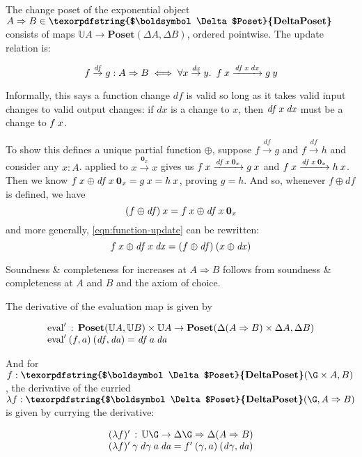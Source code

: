 \documentclass{rntz}\usepackage[a5]{rntzgeometry}\usepackage[fullwidth=130mm,width=330pt,]{narrow}
\newcommand\mathvar[1]{\ensuremath{#1}} %
\renewcommand\mathvar[1]{\ensuremath{\mathit{#1}}} %
\newcommand\cat\textbf
\newcommand\CP{\cat{\texorpdfstring{$\boldsymbol\Delta$Poset}{DeltaPoset}}}
\newcommand\Poset{\cat{Poset}}
\newcommand\expO[2]{#1 \Rightarrow #2}
\newcommand\D\Delta
\newcommand\x\times
\newcommand\fn\lambda
\newcommand\zero{\ensuremath{\mathbold{0}}}
\newcommand\<{\mskip 4mu plus 4mu minus 1mu}
\newcommand\da{\mathvar{da}}
\newcommand\dx{\mathvar{dx}}
\newcommand\df{\mathvar{df}}
\newcommand\fname\text
\newcommand\valfn{\ensuremath{\mathbb{U}}}
\newcommand\vals{\valfn}
\newcommand\chgs[1]{\D{#1}}
\newcommand\deriv[1]{\ensuremath{#1'}}
\newcommand\upd{\mathbin{\oplus}}
\newcommand\updfn{\ensuremath{{\upd}}}
\newcommand\quantifierspace{~\,}
\newcommand\fa[1]{\forall #1.\quantifierspace}
\newcommand\validarrow\to
\newcommand\valid[1]{\mathrel{\overset{#1}{\validarrow}}}
\newcommand\longvalid[1]{\mathrel{\xrightarrow{#1}}}
\newcommand\vld[3]{{#2 \valid{#1} #3}}
\newcommand\longvld[3]{{#2 \longvalid{#1} #3}}
\begin{document}
The change poset of the exponential object $\expO A B \in \CP$ consists of maps
$\vals A \to \Poset(\chgs A, \chgs B)$, ordered pointwise. The update relation
is:

\begin{equation}\label{eqn:function-update}
  f \valid\df g : \expO A B
  \iff \fa{x \valid\dx y} f\<x \longvalid{\df\<x\<\dx} g\<y
\end{equation}

\noindent Informally, this says a function change $\df$ is valid so long as it
takes valid input changes to valid output changes: if $\dx$ is a change to $x$,
then $\df\<x\<\dx$ must be a change to $f\<x$.

To show this defines a unique partial function \updfn, suppose $\vld\df f g$ and
$\vld\df f h$ and consider any $x : A$.  applied to
$\vld{\zero_x} x x$ gives us $\longvld{\df\<x\<\zero_x}{f\<x}{g\<x}$ and
$\longvld{\df\<x\<\zero_x}{f\<x}{h\<x}$. Then we know \(f\<x \upd
\df\<x\<\zero_x = g\<x = h\<x \), proving $g = h$. And so, whenever $f \upd \df$
is defined, we have
%
\[ (f \upd \df)\<x = f\<x \upd \df\<x\<\zero_x \]
%
and more generally, \cref{eqn:function-update} can be rewritten:
%
\begin{equation*}
  f\<x \upd \df\<x\<\dx = (f \upd \df)\<(x \upd \dx)
\end{equation*}

\noindent
Soundness \& completeness for increases at $\expO A B$ follows from soundness \&
completeness at $A$ and $B$ and the axiom of choice. %

The derivative of the evaluation map is given by

\[\begin{array}{l}
  \deriv{\fname{eval}} \,:\,
  \Poset(\vals A, \vals B)
  \x \vals A \to
  \Poset({\chgs{(\expO A B)} \x \chgs A},{\chgs B})
  \\
  \deriv{\fname{eval}} \<(f,a) \<(\df,\da) = \df\<a\<\da
\end{array}\]

\noindent
And for $f : \CP(\G \x A, B)$, the derivative of the curried $\fn f : \CP(\G,
\expO A B)$ is given by currying the derivative:

\[
\begin{array}{l}
  \deriv{(\fn f)} \,:\, \vals\G \to \expO{\chgs \G}{\chgs{(\expO A B)}}\\
  \deriv{(\fn f)} \<\gamma \<\mathvar{d\gamma} \<a \<\da
  = \deriv f \<(\gamma,a) \<(\mathvar{d\gamma}, \da)
\end{array}
\]
\end{document}
